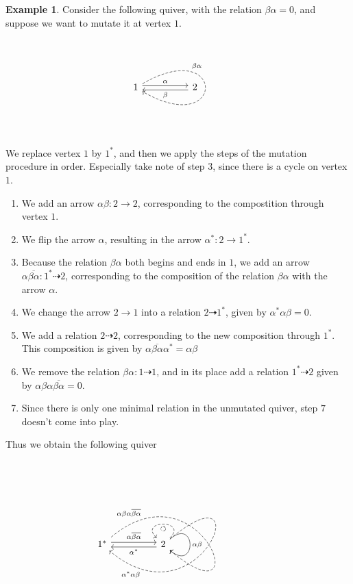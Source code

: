 \documentclass[12pt, dvipsnames, oneside]{amsart}
\theoremstyle{definition}
\newtheorem{example}{Example}[section]
\begin{document}
\begin{example}

Consider the following quiver, with the relation $\beta\alpha = 0$, and suppose we want to mutate it at vertex $1$.
\begin{equation*}
\begin{tikzcd}
1 \arrow[rr, shift left, "\alpha"] \arrow[out=30,in=330,loop,looseness=32, dashed, near start, "{\beta\alpha}"] & & 2 \arrow[ll, shift left, "\beta"] &
\end{tikzcd}
\end{equation*}
We replace vertex $1$ by $1^*$, and then we apply the steps of the mutation procedure in order. Especially take note of step 3, since there is a cycle on vertex $1$.

\begin{enumerate}
\item We add an arrow $\alpha\beta\colon 2\rightarrow 2$, corresponding to the compostition through vertex $1$.
\item We flip the arrow $\alpha$, resulting in the arrow $\alpha^*\colon 2\rightarrow 1^*$.
\item Because the relation $\beta\alpha$ both begins and ends in $1$, we add an arrow $\alpha\overline{\beta\alpha}\colon 1^*\dashrightarrow 2$, corresponding to the composition of the relation $\beta\alpha$ with the arrow $\alpha$.
\item We change the arrow $2\rightarrow 1$ into a relation $2\dashrightarrow 1^*$, given by $\alpha^*\alpha\beta=0$.
\item We add a relation $2\dashrightarrow 2$, corresponding to the new composition through $1^*$. This composition is given by $\alpha\overline{\beta\alpha}\alpha^*=\alpha\beta$
\item We remove the relation $\beta\alpha\colon1\dashrightarrow 1$, and in its place add a relation $1^*\dashrightarrow 2$ given by $\alpha\beta\alpha\overline{\beta\alpha}=0$.
\item Since there is only one minimal relation in the unmutated quiver, step $7$ doesn't come into play.
\end{enumerate}

Thus we obtain the following quiver

\begin{equation*}
\begin{tikzcd}
1^* \arrow[rr, shift left, "\alpha\overline{\beta\alpha}"] \arrow[rr, out=40,in=320,loop,looseness=5, dashed, very near start, "{\alpha\beta\alpha\overline{\beta\alpha}}"]  & & 2 \arrow[ll, shift left, "\alpha^*"] \arrow[out=40,in=320,loop, "\alpha\beta"] \arrow[ll, out=40,in=320,loop,looseness=5, dashed, very near end, "{\alpha^*\alpha\beta}"] \arrow[out=45,in=135,loop,looseness=5, dashed, "\circlearrowleft"] &
\end{tikzcd}
\end{equation*}


\end{example}
\end{document}
